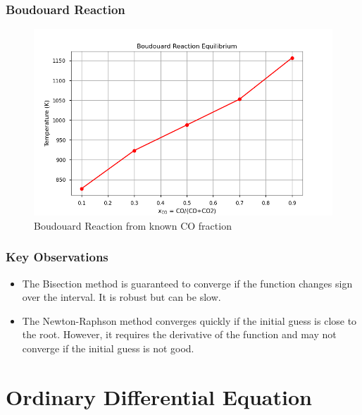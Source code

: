 \documentclass[10pt]{article}
\begin{document}
\subsubsection{Boudouard Reaction}
\begin{figure}[H]
    \centering
    \includegraphics[width=\imagewidth\textwidth]{figures/07_nonlinear/xCO_vs_T.png}
    \caption{Boudouard Reaction from known CO fraction}
\end{figure}

\subsubsection{Key Observations}
\begin{itemize}
    \item The Bisection method is guaranteed to converge if the function changes sign over the interval. It is robust but can be slow.
    \item The Newton-Raphson method converges quickly if the initial guess is close to the root. However, it requires the derivative of the function and may not converge if the initial guess is not good.
\end{itemize}

\section{Ordinary Differential Equation}
\end{document}
